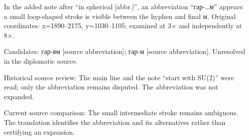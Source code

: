 In the added note after “in spherical [abbr.]”, an abbreviation “гар-…м” appears: a small loop-shaped stroke is visible between the hyphen and final м. Original coordinates: x=1890–2175, y=1030–1105; examined at 3× and independently at 8×.\par
Candidates: гар-ям [source abbreviation]; гар-м [source abbreviation]. Unresolved in the diplomatic source.\par
Historical source review: The main line and the note “start with SU(2)” were read; only the abbreviation remains disputed. The abbreviation was not expanded.\par
Current source comparison: The small intermediate stroke remains ambiguous. The translation identifies the abbreviation and its alternatives rather than certifying an expansion.\par\medskip
